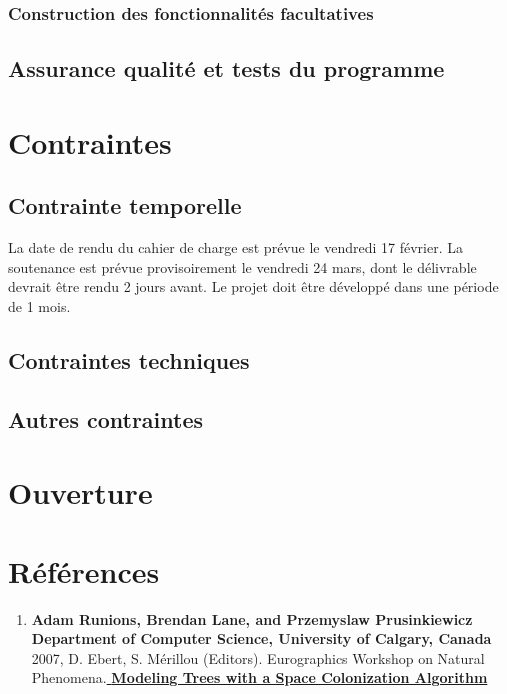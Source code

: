 \documentclass[a4paper]{article}
\begin{document}
			

		\subsubsection{Construction des fonctionnalités facultatives}

			

	\subsection{Assurance qualité et tests du programme}

		

\section{Contraintes}

	\subsection{Contrainte temporelle}
		La date de rendu du cahier de charge est prévue le vendredi 17 février.
		La soutenance est prévue provisoirement le vendredi 24 mars, dont le délivrable devrait être rendu 2 jours avant.
		Le projet doit être développé dans une période de 1 mois.

	\subsection{Contraintes techniques}

		

	\subsection{Autres contraintes}

\section{Ouverture}

\section{Références}\label{Ref}
\begin{enumerate}

\item \textbf{Adam Runions, Brendan Lane, and Przemyslaw Prusinkiewicz
Department of Computer Science, University of Calgary, Canada} 2007, D. Ebert, S. Mérillou (Editors). Eurographics Workshop on Natural Phenomena.\href{run:./colonization.egwnp2007.pdf}{\textbf{ Modeling Trees with a Space Colonization Algorithm }}\\
\end{enumerate}		

\newpage

\begin{appendices} 
	
\end{appendices} 
\end{document}
